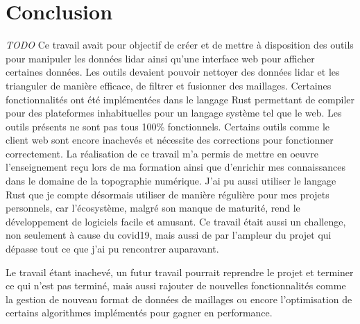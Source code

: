 \chapter*{Conclusion}

\textit{TODO}
 Ce travail avait pour objectif de créer et de mettre à disposition des outils pour manipuler les données \gls{lidar} ainsi qu'une interface web pour afficher certaines données.
Les outils devaient pouvoir nettoyer des données \gls{lidar} et les trianguler de manière efficace, de filtrer et fusionner des maillages.
Certaines fonctionnalités ont été implémentées dans le langage Rust permettant de compiler pour des plateformes inhabituelles pour un langage système tel que le web.
Les outils présents ne sont pas tous 100\% fonctionnels.
Certains outils comme le client web sont encore inachevés et nécessite des corrections pour fonctionner correctement.
La réalisation de ce travail m'a permis de mettre en oeuvre l'enseignement reçu lors de ma formation ainsi que d'enrichir mes connaissances dans le domaine de la topographie numérique. J'ai pu aussi utiliser le langage Rust que je compte désormais utiliser de manière régulière pour mes projets personnels, car l'écosystème, malgré son manque de maturité, rend le développement de logiciels facile et amusant. Ce travail était aussi un challenge, non seulement à cause du covid19, mais aussi de par l'ampleur du projet qui dépasse tout ce que j'ai pu rencontrer auparavant.

Le travail étant inachevé, un futur travail pourrait reprendre le projet et terminer ce qui n'est pas terminé, mais aussi rajouter de nouvelles fonctionnalités comme la gestion de nouveau format de données de maillages ou encore l'optimisation de certains algorithmes implémentés pour gagner en performance.